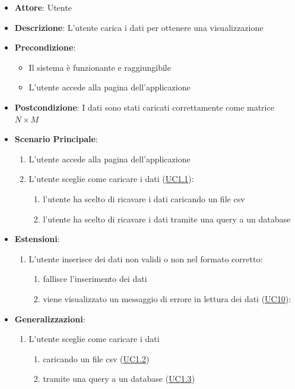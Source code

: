     \begin{itemize}
    \item \textbf{Attore}: Utente
    \item \textbf{Descrizione}: L'utente carica i dati per ottenere una visualizzazione
    \item \textbf{Precondizione}:
    \begin{itemize}
        \item Il sistema è funzionante e raggiungibile
        \item L'utente accede alla pagina dell'applicazione
    \end{itemize}
    \item \textbf{Postcondizione}: I dati sono stati caricati correttamente come matrice $N\times M$
    \item \textbf{Scenario Principale}: 
        \begin{enumerate}
            \item L'utente accede alla pagina dell'applicazione
            \item L'utente sceglie come caricare i dati (\hyperref[uc1.1]{UC1.1}):
                \begin{enumerate}
                    \item l'utente ha scelto di ricavare i dati caricando un file csv
                    \item l'utente ha scelto di ricavare i dati tramite una query a un database
                \end{enumerate}
        \end{enumerate}  
    \item \textbf{Estensioni}:
        \begin{enumerate}
            \item L'utente inserisce dei dati non validi o non nel formato corretto:
                \begin{enumerate}
                    \item fallisce l'inserimento dei dati
                    \item viene visualizzato un messaggio di errore in lettura dei dati (\hyperref[uc10]{UC10}):
                \end{enumerate}
        \end{enumerate}  
    \item \textbf{Generalizzazioni}:
        \begin{enumerate}
            \item L'utente sceglie come caricare i dati
                \begin{enumerate}
                    \item caricando un file csv (\hyperref[uc1.2]{UC1.2})
                    \item tramite una query a un database (\hyperref[uc1.3]{UC1.3})
                \end{enumerate}
        \end{enumerate}  
    \end{itemize}
    

